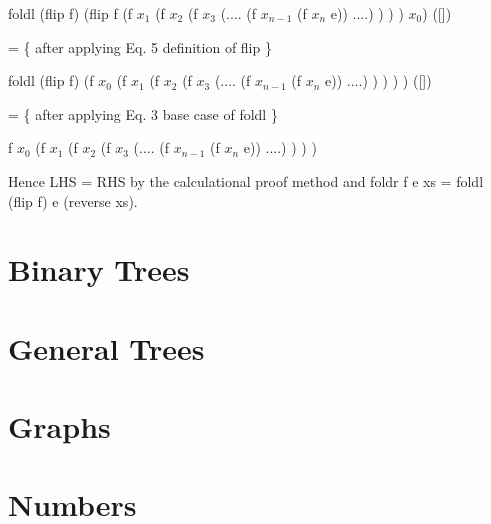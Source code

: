 \documentclass[twocolumn]{article}
\begin{document}
	 foldl (flip f) (flip f (f $x_{1}$ (f $x_{2}$ (f $x_{3}$ (.... (f $x_{n-1}$ (f $x_{n}$ e)) ....) ) ) ) $x_{0}$) ([])

	 = \{ after applying Eq. 5 definition of flip \}
	 
	 foldl (flip f) (f $x_{0}$ (f $x_{1}$ (f $x_{2}$ (f $x_{3}$ (.... (f $x_{n-1}$ (f $x_{n}$ e)) ....) ) ) ) ) ([])

	 = \{ after applying Eq. 3 base case of foldl \}
	 
	 f $x_{0}$ (f $x_{1}$ (f $x_{2}$ (f $x_{3}$ (.... (f $x_{n-1}$ (f $x_{n}$ e)) ....) ) ) )
	 
	 
	
	
	Hence LHS = RHS by the calculational proof method and foldr f e xs = foldl (flip f) e (reverse xs).



\section{Binary Trees}

\section{General Trees}

\section{Graphs}

\section{Numbers}

	
	


{
\footnotesize

\addtolength{\itemsep}{-2mm}

}
\end{document}
